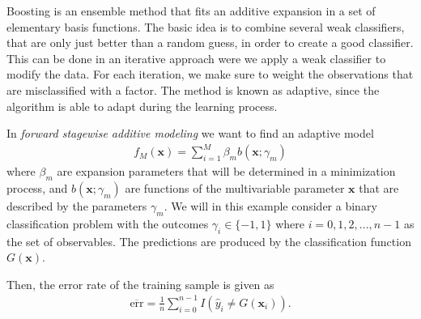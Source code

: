 Boosting is an ensemble method that fits an additive expansion in a set of elementary basis functions. The basic idea is to combine several weak classifiers, that are only just better than a random guess, in order to create a good classifier. This can be done in an iterative approach were we apply a weak classifier to modify the data. For each iteration, we make sure to weight the observations that are misclassified with a factor. The method is known as adaptive, since the algorithm is able to adapt during the learning process.

In \textit{forward stagewise additive modeling} we want to find an adaptive model
\begin{align}
  f_M (\textbf{x}) = \sum_{i=1}^M \beta_m b(\textbf{x}; \gamma_m)
\end{align}
where $\beta_m$ are expansion parameters that will be determined in a minimization process, and $b(\textbf{x};\gamma_m)$ are functions of the multivariable parameter $\textbf{x}$ that are described by the parameters $\gamma_m$. We will in this example consider a binary classification problem with the outcomes $\gamma_i \in \{-1,1\}$ where $i=0,1,2,...,n-1$ as the set of observables. The predictions are produced by the classification function $G(\textbf{x})$.

Then, the error rate of the training sample is given as
\begin{align}
  \overline{\text{err}} = \frac{1}{n} \sum_{i=0}^{n-1} I(\hat{y}_i \neq G(\textbf{x}_i)).
\end{align}

